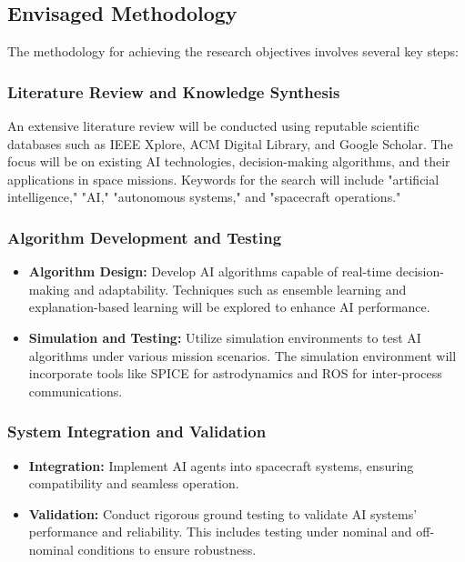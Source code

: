 \documentclass[a4paper,12pt]{article}
\begin{document}
\subsection{Envisaged Methodology}

The methodology for achieving the research objectives involves several key steps:

\subsubsection{Literature Review and Knowledge Synthesis}

An extensive literature review will be conducted using reputable scientific databases such as IEEE Xplore, ACM Digital Library, and Google Scholar. The focus will be on existing AI technologies, decision-making algorithms, and their applications in space missions. Keywords for the search will include "artificial intelligence," "AI," "autonomous systems," and "spacecraft operations."

\subsubsection{Algorithm Development and Testing}

\begin{itemize}
    \item \textbf{Algorithm Design:} Develop AI algorithms capable of real-time decision-making and adaptability. Techniques such as ensemble learning and explanation-based learning will be explored to enhance AI performance.
    \item \textbf{Simulation and Testing:} Utilize simulation environments to test AI algorithms under various mission scenarios. The simulation environment will incorporate tools like SPICE for astrodynamics and ROS for inter-process communications.
\end{itemize}

\subsubsection{System Integration and Validation}

\begin{itemize}
    \item \textbf{Integration:} Implement AI agents into spacecraft systems, ensuring compatibility and seamless operation.
    \item \textbf{Validation:} Conduct rigorous ground testing to validate AI systems' performance and reliability. This includes testing under nominal and off-nominal conditions to ensure robustness.
\end{itemize}
\end{document}
